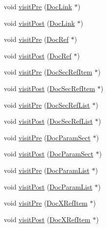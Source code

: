 \begin{DoxyCompactItemize}
void \hyperlink{class_html_doc_visitor_af26ad18e0f59bef08e813b887c5a28dd}{visit\+Pre} (\hyperlink{class_doc_link}{Doc\+Link} $\ast$)
\item 
void \hyperlink{class_html_doc_visitor_a9a67241f301abd7cf1dc0f22a985fc27}{visit\+Post} (\hyperlink{class_doc_link}{Doc\+Link} $\ast$)
\item 
void \hyperlink{class_html_doc_visitor_ae9c6906a51495b487e8df1edf9a6286a}{visit\+Pre} (\hyperlink{class_doc_ref}{Doc\+Ref} $\ast$)
\item 
void \hyperlink{class_html_doc_visitor_a0ead906cb3abf9600d47d7b4bb74087f}{visit\+Post} (\hyperlink{class_doc_ref}{Doc\+Ref} $\ast$)
\item 
void \hyperlink{class_html_doc_visitor_a19c9d623b0b2faef0acaa1a1207fbf69}{visit\+Pre} (\hyperlink{class_doc_sec_ref_item}{Doc\+Sec\+Ref\+Item} $\ast$)
\item 
void \hyperlink{class_html_doc_visitor_a4c50facb63ee93a3839555206d693c22}{visit\+Post} (\hyperlink{class_doc_sec_ref_item}{Doc\+Sec\+Ref\+Item} $\ast$)
\item 
void \hyperlink{class_html_doc_visitor_ab7fe0006066a8a2b01ae839019778660}{visit\+Pre} (\hyperlink{class_doc_sec_ref_list}{Doc\+Sec\+Ref\+List} $\ast$)
\item 
void \hyperlink{class_html_doc_visitor_a868a9d3ed152412ad1232d01ce3c2605}{visit\+Post} (\hyperlink{class_doc_sec_ref_list}{Doc\+Sec\+Ref\+List} $\ast$)
\item 
void \hyperlink{class_html_doc_visitor_aa6ed13d4955d822abefce7f50eac4b82}{visit\+Pre} (\hyperlink{class_doc_param_sect}{Doc\+Param\+Sect} $\ast$)
\item 
void \hyperlink{class_html_doc_visitor_a1b5d6c6a77d87854fd577caaca00bdaf}{visit\+Post} (\hyperlink{class_doc_param_sect}{Doc\+Param\+Sect} $\ast$)
\item 
void \hyperlink{class_html_doc_visitor_a4a69d333ebf1d56d08a94f54eeb1b815}{visit\+Pre} (\hyperlink{class_doc_param_list}{Doc\+Param\+List} $\ast$)
\item 
void \hyperlink{class_html_doc_visitor_a3c880a11290c7179b4b176fba2b7befc}{visit\+Post} (\hyperlink{class_doc_param_list}{Doc\+Param\+List} $\ast$)
\item 
void \hyperlink{class_html_doc_visitor_adaa4ea2f6fa64fe48cd48cac42530792}{visit\+Pre} (\hyperlink{class_doc_x_ref_item}{Doc\+X\+Ref\+Item} $\ast$)
\item 
void \hyperlink{class_html_doc_visitor_a403afc2a4e23642f3f9447d8233318d0}{visit\+Post} (\hyperlink{class_doc_x_ref_item}{Doc\+X\+Ref\+Item} $\ast$)

\end{DoxyCompactItemize}
